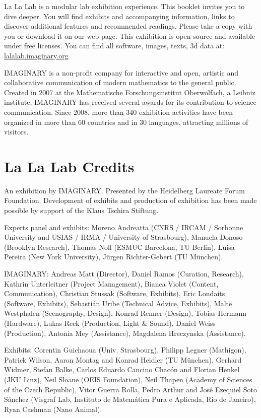 La La Lab is a modular lab exhibition experience. This booklet invites you to dive deeper. You will find exhibits and accompanying information, links to discover additional features and recommended readings. Please take a copy with you or download it on our web page. This exhibition is open source and available under free licenses. You can find all software, images, texts, 3d data at:  \url{lalalab.imaginary.org}


IMAGINARY is a non-profit company for interactive and open, artistic and collaborative communication of modern mathematics to the general public. Created in 2007 at the Mathematische Forschungsinstitut Oberwolfach, a Leibniz institute, IMAGINARY has received several awards for its contribution to science communication. Since 2008, more than 340 exhibition activities have been organized in more than 60 countries and in 30 languages, attracting millions of visitors.


\section*{La La Lab Credits}
An exhibition by IMAGINARY.
Presented by the Heidelberg Laureate Forum Foundation.
Development of exhibits and production of exhibition has been made possible by support of the Klaus Tschira Stiftung.

Experts panel and exhibits:
Moreno Andreatta (CNRS / IRCAM / Sorbonne University and USIAS / IRMA / University of Strasbourg), Manuela Donoso (Brooklyn Research), Thomas Noll (ESMUC Barcelona, TU Berlin), Luisa Pereira (New York University), Jürgen Richter-Gebert (TU München).




IMAGINARY:
Andreas Matt (Director), Daniel Ramos (Curation, Research), Kathrin Unterleitner (Project Management), Bianca Violet (Content, Communication), Christian Stussak (Software, Exhibits), Eric Londaits (Software, Exhibits), Sebastián Uribe (Technical Advice, Exhibits), Malte Westphalen (Scenography, Design), Konrad Renner (Design), Tobias Hermann (Hardware), Lukas Reck (Production, Light \& Sound), Daniel Weiss (Production), Antonia Mey (Assistance), Magdalena Hreczynska (Assistance).

Exhibits:
Corentin Guichaoua (Univ. Strasbourg), Philipp Legner (Mathigon), Patrick Wilson, Aaron Montag and Konrad Heidler (TU
 München), Gerhard Widmer, Stefan Balke, Carlos Eduardo Cancino Chacón and Florian Henkel (JKU Linz), Neil Sloane (OEIS Foundation), Neil Thapen (Academy of Sciences of the Czech Republic), Vitor Guerra Rolla, Pedro Arthur and José Ezequiel Soto Sánchez (Visgraf Lab, Instituto de Matemática Pura e Aplicada, Rio de Janeiro), Ryan Cashman (Nano Animal).

